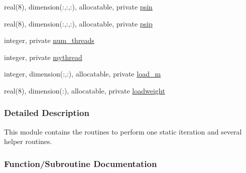 \begin{DoxyCompactItemize}
\item 
real(8), dimension(\+:,\+:,\+:), allocatable, private \hyperlink{namespacestaticstep_afd576c66455f9e0537bf703b10a6a9eb}{psin}
\item 
real(8), dimension(\+:,\+:,\+:), allocatable, private \hyperlink{namespacestaticstep_af4d990f6823f777da64820a0c2b57616}{psip}
\item 
integer, private \hyperlink{namespacestaticstep_a3a3097b03f69cc230a1cb4f99edfd657}{num\+\_\+threads}
\item 
integer, private \hyperlink{namespacestaticstep_a97ea4745bce5d66d8e1d52b1faab0961}{mythread}
\item 
integer, dimension(\+:,\+:), allocatable, private \hyperlink{namespacestaticstep_a87b0a1d8427decf30e957bb3f16b0d37}{load\+\_\+m}
\item 
real(8), dimension(\+:), allocatable, private \hyperlink{namespacestaticstep_a1986460549ea65bc38b06fa1dcca5c80}{loadweight}
\end{DoxyCompactItemize}


\subsubsection{Detailed Description}
This module contains the routines to perform one static iteration and several helper routines. 

\subsubsection{Function/\+Subroutine Documentation}
